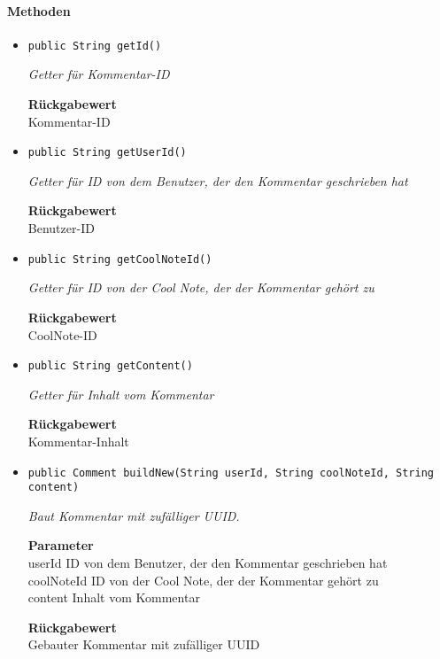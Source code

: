      \paragraph*{Methoden}
     \begin{itemize}
     	\item{\texttt{public String getId()}}
     	
     	\textit{Getter für Kommentar-ID}
     	
     	
     	
     	\textbf{Rückgabewert} \\
     	Kommentar-ID        \item{\texttt{public String getUserId()}}
     	
     	\textit{Getter für ID von dem Benutzer, der den Kommentar geschrieben hat}
     	
     	
     	
     	\textbf{Rückgabewert} \\
     	Benutzer-ID        \item{\texttt{public String getCoolNoteId()}}
     	
     	\textit{Getter für ID von der Cool Note, der der Kommentar gehört zu}
     	
     	
     	
     	\textbf{Rückgabewert} \\
     	CoolNote-ID        \item{\texttt{public String getContent()}}
     	
     	\textit{Getter für Inhalt vom Kommentar}
     	
     	
     	
     	\textbf{Rückgabewert} \\
     	Kommentar-Inhalt        \item{\texttt{public Comment buildNew(String userId, String coolNoteId, String content)}}
     	
     	\textit{Baut Kommentar mit zufälliger UUID.}
     	
     	\textbf{Parameter} \\
     	userId ID von dem Benutzer, der den Kommentar geschrieben hat\\
     	coolNoteId ID von der Cool Note, der der Kommentar gehört zu\\
     	content Inhalt vom Kommentar
     	
     	\textbf{Rückgabewert} \\
     	Gebauter Kommentar mit zufälliger UUID
     \end{itemize}
